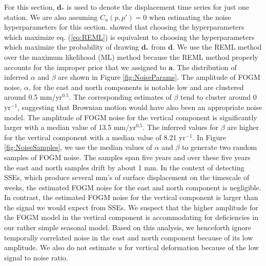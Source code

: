 \documentclass[10pt,letter]{article}
\begin{document}
For this section, $\bm{d}_*$ is used to denote the displacement time series for just one station. We are also assuming $C_u(p,p')=0$ when estimating the noise hyperparameters for this section. \citet{Harville1974} showed that choosing the hyperparameters which maximize eq. (\ref{eq:REML}) is equivalent to choosing the hyperparameters which maximize the probability of drawing $\bm{d}_*$ from $\bm{d}$.  We use the REML method over the maximum likelihood (ML) method \citep[e.g.,][]{Langbein1997} because the REML method properly accounts for the improper prior that we assigned to $\bm{a}$. The distribution of inferred $\alpha$ and $\beta$ are shown in Figure \ref{fig:NoiseParams}. The amplitude of FOGM noise, $\alpha$, for the east and north components is notable low and are clustered around 0.5 mm/yr$^{0.5}$. The corresponding estimates of $\beta$ tend to cluster around 0 yr$^{-1}$, suggesting that Brownian motion would have also been an appropriate noise model. The amplitude of FOGM noise for the vertical component is significantly larger with a median value of 13.5 mm/yr$^{0.5}$. The inferred values for $\beta$ are higher for the vertical component with a median value of 8.21 yr$^{-1}$. In Figure \ref{fig:NoiseSamples}, we use the median values of $\alpha$ and $\beta$ to generate two random samples of FOGM noise. The samples span five years and over these five years the east and north samples drift by about 1 mm. In the context of detecting SSEs, which produce several mm's of surface displacement on the timescale of weeks, the estimated FOGM noise for the east and north component is negligible. In contrast, the estimated FOGM noise for the vertical component is larger than the signal we would expect from SSEs. We suspect that the higher amplitude for the FOGM model in the vertical component is accommodating for deficiencies in our rather simple seasonal model. Based on this analysis, we henceforth ignore temporally correlated noise in the east and north component because of its low amplitude. We also do not estimate $u$ for vertical deformation because of the low signal to noise ratio.
\end{document}
